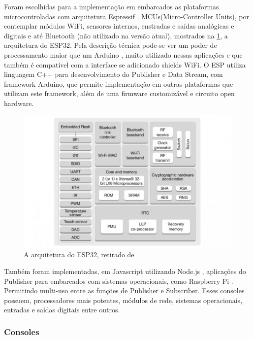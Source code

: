 Foram escolhidas para a implementação em embarcados as plataformas microcontroladas com arquitetura Espressif \cite{espressif}. MCUs(Micro-Controller Units), por contemplar módulos WiFi, sensores internos, enstradas e saídas analógicas e digitais e até Bluetooth (não utilizado na versão atual), mostrados na \ref{fig:3.3.4/esp32-arch}, a arquitetura do ESP32. Pela descrição técnica pode-se ver um poder de processamento maior que um Arduino \cite{arduino}, muito utilizado nessas aplicações e que também é compatível com a interface se adicionado shields WiFi. O ESP utiliza linguagem C++ \cite{c++} para desenvolvimento do Publisher e Data Stream, com framework Arduino, que permite implementação em outras plataformas que utilizam este framework, além de uma firmware customizável e circuito open hardware.

\begin{figure}[h!]
\centering
\includegraphics[width=13cm]{./02_Capitulos/02_Cap3/figures/espressif32-arch}
\caption{A arquitetura do ESP32, retirado de \cite{espressif}}
\label{fig:3.3.4/esp32-arch}
\end{figure}


Também foram implementadas, em Javascript  utilizando Node.js \cite{nodejs}, aplicações do Publisher para embarcados com sistemas operacionais, como Raspberry Pi \cite{raspberry-pi}. Permitindo multi-uso entre as funções de Publisher e Subscriber. Esses consoles possuem, processadores mais potentes, módulos de rede, sistemas operacionais, entradas e saídas digitais entre outros.


\subsubsection{Consoles}
\label{subsubsection:consoles}

